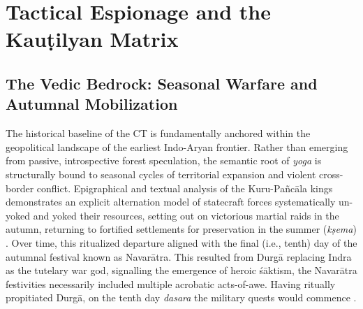 \documentclass[11pt,twoside,letterpaper]{article}
\begin{document}

\section{Tactical Espionage and the Kauṭilyan Matrix}
\label{sec:tactical_espionage_kautilyan_matrix}

\subsection{The Vedic Bedrock: Seasonal Warfare and Autumnal Mobilization}

The historical baseline of the CT is fundamentally anchored within the geopolitical landscape of the earliest Indo-Aryan frontier. Rather than emerging from passive, introspective forest speculation, the semantic root of \textit{yoga} is structurally bound to seasonal cycles of territorial expansion and violent cross-border conflict. Epigraphical and textual analysis of the Kuru-Pañcāla kings demonstrates an explicit alternation model of statecraft forces systematically un-yoked and yoked their resources, setting out on victorious martial raids in the autumn, returning to fortified settlements for preservation in the summer (\textit{kṣema}) \citep{oberlies2024, witzel1997, witzel2023}. Over time, this ritualized departure aligned with the final (i.e., tenth) day of the autumnal festival known as Navarātra. This resulted from Durgā replacing Indra as the tutelary war god, signalling the emergence of heroic śāktism, the Navarātra festivities necessarily included multiple acrobatic acts-of-awe. Having ritually propitiated Durgā, on the tenth day \textit{dasara} the military quests would commence \citep{suebsantiwongse2023, sarkar2020, sarkar2017}. 
\end{document}

